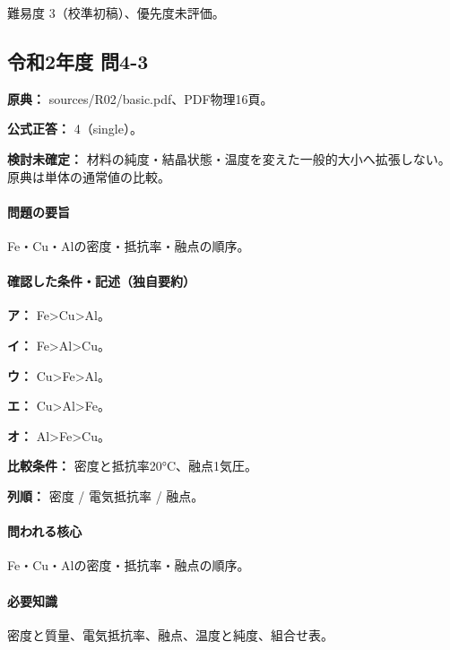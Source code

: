 \par 難易度 3（校準初稿）、優先度未評価。

\subsection{令和2年度 問4-3}
\label{q:r02-reg-basic-4-3}

\noindent\textbf{原典：} sources/R02/basic.pdf、PDF物理16頁。

\textbf{公式正答：} 4（single）。

\par\textbf{検討未確定：} 材料の純度・結晶状態・温度を変えた一般的大小へ拡張しない。原典は単体の通常値の比較。

\paragraph{問題の要旨} Fe・Cu・Alの密度・抵抗率・融点の順序。

\paragraph{確認した条件・記述（独自要約）}\mbox{}\par

\noindent\textbf{ア：} Fe>Cu>Al。\par

\noindent\textbf{イ：} Fe>Al>Cu。\par

\noindent\textbf{ウ：} Cu>Fe>Al。\par

\noindent\textbf{エ：} Cu>Al>Fe。\par

\noindent\textbf{オ：} Al>Fe>Cu。\par

\noindent\textbf{比較条件：} 密度と抵抗率20°C、融点1気圧。\par

\noindent\textbf{列順：} 密度 / 電気抵抗率 / 融点。\par

\paragraph{問われる核心} Fe・Cu・Alの密度・抵抗率・融点の順序。

\paragraph{必要知識} 密度と質量、電気抵抗率、融点、温度と純度、組合せ表。

